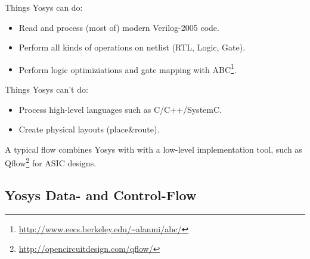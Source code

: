 \begin{frame}{\subsecname}

Things Yosys can do:
\begin{itemize}
\item Read and process (most of) modern Verilog-2005 code.
\item Perform all kinds of operations on netlist (RTL, Logic, Gate).
\item Perform logic optimiziations and gate mapping with ABC\footnote[frame]{\url{http://www.eecs.berkeley.edu/~alanmi/abc/}}.
\end{itemize}

\bigskip
Things Yosys can't do:
\begin{itemize}
\item Process high-level languages such as C/C++/SystemC.
\item Create physical layouts (place\&route).
\end{itemize}

\bigskip
A typical flow combines Yosys with with a low-level implementation tool, such
as Qflow\footnote[frame]{\url{http://opencircuitdesign.com/qflow/}} for ASIC designs.

\end{frame}


\subsection{Yosys Data- and Control-Flow}

